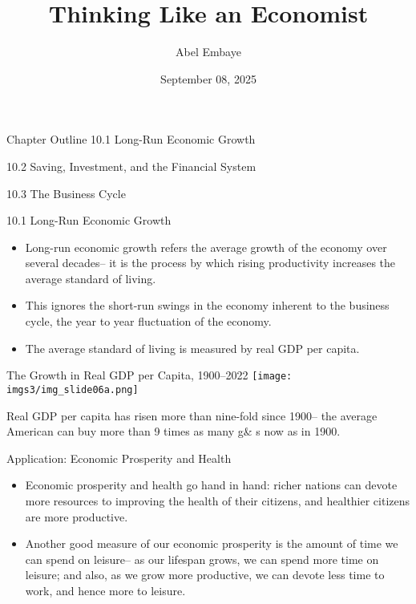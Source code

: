 \documentclass[
  12pt,
  ignorenonframetext,
]{beamer}
\title{Thinking Like an Economist}
\author{Abel Embaye}
\date{September 08, 2025}
\institute{Department of Economics\\
\strut \\
UofA\\}
\begin{document}
\frame{\titlepage}

\begin{frame}{Chapter Outline}
\protect\hypertarget{chapter-outline}{}
10.1 Long-Run Economic Growth

10.2 Saving, Investment, and the Financial System

10.3 The Business Cycle
\end{frame}

\begin{frame}{10.1 Long-Run Economic Growth}
\protect\hypertarget{long-run-economic-growth}{}
\begin{itemize}
\item
  Long-run economic growth refers the average growth of the economy over
  several decades-- it is the process by which rising productivity
  increases the average standard of living.
\item
  This ignores the short-run swings in the economy inherent to the
  business cycle, the year to year fluctuation of the economy.
\item
  The average standard of living is measured by real GDP per capita.
\end{itemize}
\end{frame}

\begin{frame}{The Growth in Real GDP per Capita, 1900--2022}
\protect\hypertarget{the-growth-in-real-gdp-per-capita-19002022}{}
\texttt{[image: imgs3/img\_slide06a.png]}

Real GDP per capita has risen more than nine-fold since 1900-- the
average American can buy more than 9 times as many g\& s now as in 1900.
\end{frame}

\begin{frame}{Application: Economic Prosperity and Health}
\protect\hypertarget{application-economic-prosperity-and-health}{}
\begin{itemize}
\item
  Economic prosperity and health go hand in hand: richer nations can
  devote more resources to improving the health of their citizens, and
  healthier citizens are more productive.
\item
  Another good measure of our economic prosperity is the amount of time
  we can spend on leisure-- as our lifespan grows, we can spend more
  time on leisure; and also, as we grow more productive, we can devote
  less time to work, and hence more to leisure.
\end{itemize}
\end{frame}
\end{document}
